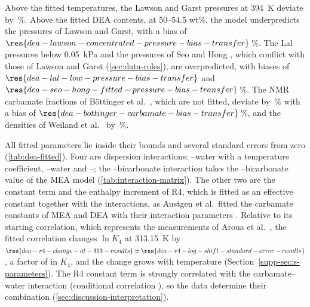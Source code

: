 Above the fitted temperatures, the  Lawson and Garst pressures at \SI{394}{\kelvin} deviate by \,\%.
Above the fitted DEA contents, at 50--54.5 wt\%, the model underpredicts the pressures of Lawson and Garst, with a bias of $\res{dea-lawson-concentrated-pressure-bias-transfer}$\,\%.
The Lal pressures below \SI{0.05}{\kilo\pascal} and the pressures of Seo and Hong \cite{seoSolubilitiesCarbonDioxide1996}, which conflict with those of Lawson and Garst (\cref{sec:data-roles}), are overpredicted, with biases of $\res{dea-lal-low-pressure-bias-transfer}$ and $\res{dea-seo-hong-fitted-pressure-bias-transfer}$\,\%.
The NMR carbamate fractions of B\"ottinger et al.\ \cite{Bottinger2008}, which are not fitted, deviate by \,\% with a bias of $\res{dea-bottinger-carbamate-bias-transfer}$\,\%, and the densities of Weiland et al.\ \cite{Weiland1998} by \,\%.

All  fitted parameters lie inside their bounds and several standard errors from zero (\cref{tab:dea-fitted}).
Four are dispersion interactions: --water with a temperature coefficient, --water and --\COtwo; the --bicarbonate interaction takes the --bicarbonate value of the MEA model (\cref{tab:interaction-matrix}).
The other two are the constant term and the enthalpy increment of R4, which is fitted as an effective constant together with the interactions, as Austgen et al.\ fitted the carbamate constants of MEA and DEA with their interaction parameters \cite{Austgen1991}.
Relative to its starting correlation, which represents the measurements of Aroua et al.\ \cite{arouaTemperatureDependencyEquilibrium1997}, the fitted correlation changes $\ln K_4$ at \SI{313.15}{\kelvin} by $\res{dea-r4-change-at-313-results}\pm\res{dea-r4-log-shift-standard-error-results}$, a factor of  in $K_4$, and the change grows with temperature (Section~\ref{supp-sec:s-parameters}).
The R4 constant term is strongly correlated with the carbamate--water interaction (conditional correlation ), so the data determine their combination (\cref{sec:discussion-interpretation}).

